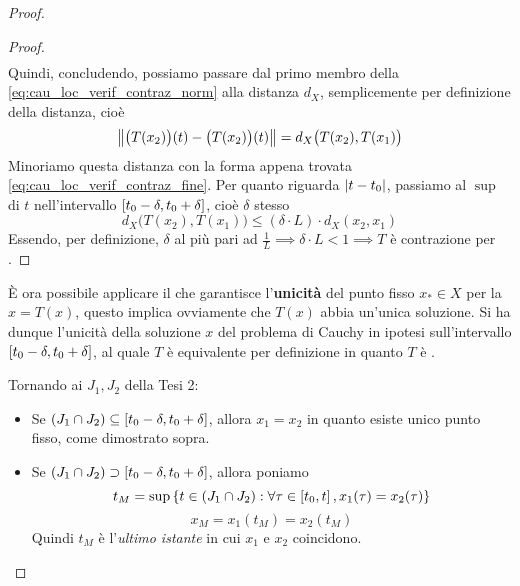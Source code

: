 \begin{theorem}
\begin{proof}
\begin{itemize}
\begin{proof}
\begin{align*}
			\end{align*}
			Quindi, concludendo, possiamo passare dal primo membro della \cref{eq:cau_loc_verif_contraz_norm} alla distanza $d_X$, semplicemente per definizione della distanza, cioè
			$$\left\|\bigl(T(x_2)\bigr)(t) - \bigl(T(x_2)\bigr)(t)\right\| = d_X\bigl(T(x_2),T(x_1)\bigr)$$
			Minoriamo questa distanza con la forma appena trovata \cref{eq:cau_loc_verif_contraz_fine}. Per quanto riguarda $\left|t-t_0\right|$, passiamo al $\sup$ di $t$ nell'intervallo $\left[t_0-\delta,t_0+\delta\right]$, cioè $\delta$ stesso
			$$d_X\bigl(T(x_2),T(x_1)\bigr) \leq (\delta \cdot L) \cdot d_X(x_2,x_1)$$
			Essendo, per definizione, $\delta$ al più pari ad $\frac{1}{L} \implies \delta\cdot L<1 \implies T$ è contrazione per .
			\end{proof}
		\end{itemize}
		È ora possibile applicare il  che garantisce l'\textbf{unicità} del punto fisso $x_* \in X$ per la $x = T(x)$, questo implica ovviamente che $T(x)$ abbia un'unica soluzione. Si ha dunque l'unicità della soluzione $x$ del problema di Cauchy in ipotesi sull'intervallo $\left[t_0-\delta,t_0+\delta\right]$, al quale $T$ è equivalente per definizione in quanto $T$ è .

		Tornando ai $J_1, J_2$ della Tesi 2:
		\begin{itemize}
			\item Se $(J_1 \cap J_2) \subseteq \left[t_0-\delta,t_0+\delta\right]$, allora $x_1 = x_2$ in quanto esiste unico punto fisso, come dimostrato sopra.
			\item Se $(J_1 \cap J_2) \supset \left[t_0-\delta,t_0+\delta\right]$, allora poniamo
				\begin{equation}
					t_M = \sup \left\{t \in (J_1 \cap J_2): \forall \tau \in \left[t_0,t\right], x_1(\tau)=x_2(\tau)\right\}\label{eq:cau_loc_tM_J1J2_supset}
				\end{equation}
				$$x_M = x_1(t_M) = x_2(t_M)$$
				Quindi $t_M$ è l'\textit{ultimo istante} in cui $x_1$ e $x_2$ coincidono.


\end{itemize}
\end{proof}
\end{theorem}
